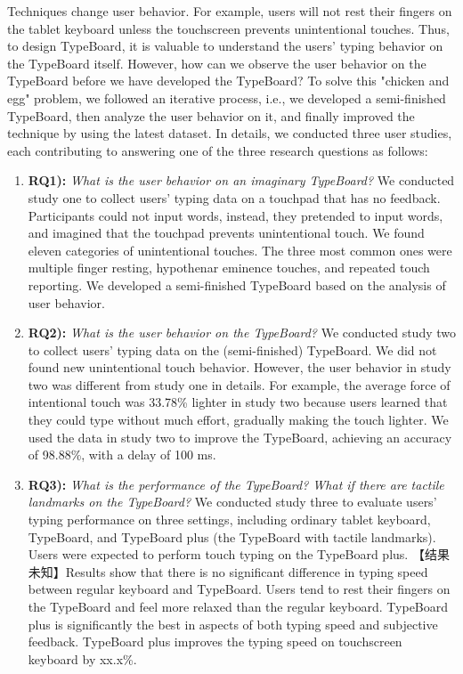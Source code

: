 Techniques change user behavior. For example, users will not rest their fingers on the tablet keyboard unless the touchscreen prevents unintentional touches. Thus, to design TypeBoard, it is valuable to understand the users' typing behavior on the TypeBoard itself. However, how can we observe the user behavior on the TypeBoard before we have developed the TypeBoard? To solve this "chicken and egg" problem, we followed an iterative process, i.e., we developed a semi-finished TypeBoard, then analyze the user behavior on it, and finally improved the technique by using the latest dataset. In details, we conducted three user studies, each contributing to answering one of the three research questions as follows:


\begin{enumerate}
	\item{\textbf{RQ1):} \emph{What is the user behavior on an imaginary TypeBoard?} We conducted study one to collect users' typing data on a touchpad that has no feedback. Participants could not input words, instead, they pretended to input words, and imagined that the touchpad prevents unintentional touch. We found eleven categories of unintentional touches. The three most common ones were multiple finger resting, hypothenar eminence touches, and repeated touch reporting. We developed a semi-finished TypeBoard based on the analysis of user behavior.}
	\item{\textbf{RQ2):} \emph{What is the user behavior on the TypeBoard?} We conducted study two to collect users' typing data on the (semi-finished) TypeBoard. We did not found new unintentional touch behavior. However, the user behavior in study two was different from study one in details. For example, the average force of intentional touch was 33.78\% lighter in study two because users learned that they could type without much effort, gradually making the touch lighter. We used the data in study two to improve the TypeBoard, achieving an accuracy of 98.88\%, with a delay of 100 ms.}
	\item{\textbf{RQ3):} \emph{What is the performance of the TypeBoard? What if there are tactile landmarks on the TypeBoard?} We conducted study three to evaluate users' typing performance on three settings, including ordinary tablet keyboard, TypeBoard, and TypeBoard plus (the TypeBoard with tactile landmarks). Users were expected to perform touch typing on the TypeBoard plus. 【结果未知】Results show that there is no significant difference in typing speed between regular keyboard and TypeBoard. Users tend to rest their fingers on the TypeBoard and feel more relaxed than the regular keyboard. TypeBoard plus is significantly the best in aspects of both typing speed and subjective feedback. TypeBoard plus improves the typing speed on touchscreen keyboard by xx.x\%.}
\end{enumerate}

